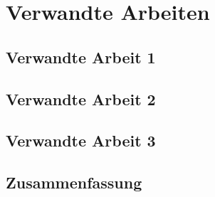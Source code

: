 %


\chapter{Verwandte Arbeiten}
\label{sec:related}



\section{Verwandte Arbeit 1}
\label{sec:related:sec1}



\section{Verwandte Arbeit 2}
\label{sec:related:sec2}



\section{Verwandte Arbeit 3}
\label{sec:related:sec3}



\section{Zusammenfassung}
\label{sec:related:conclusion}

